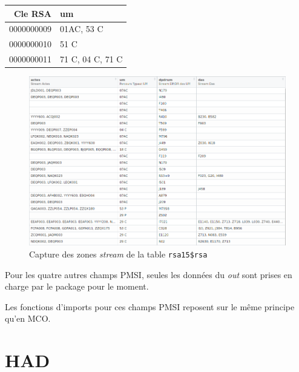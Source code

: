 \documentclass[
]{book}
\begin{document}
\begin{longtable}[]{@{}rl@{}}
\toprule()
Cle RSA & um \\
\midrule()
\endhead
0000000009 & 01AC, 53 C \\
0000000010 & 51 C \\
0000000011 & 71 C, 04 C, 71 C \\
\bottomrule()
\end{longtable}

\begin{figure}
\centering
\includegraphics{images/rsa_stream.png}
\caption{Capture des zones \emph{stream} de la table \texttt{rsa15\$rsa}}
\end{figure}

Pour les quatre autres champs PMSI, seules les données du \emph{out} sont prises en charge par le package pour le moment.

Les fonctions d'imports pour ces champs PMSI reposent sur le même principe qu'en MCO.

\hypertarget{had}{%
\section{HAD}\label{had}}
\end{document}
